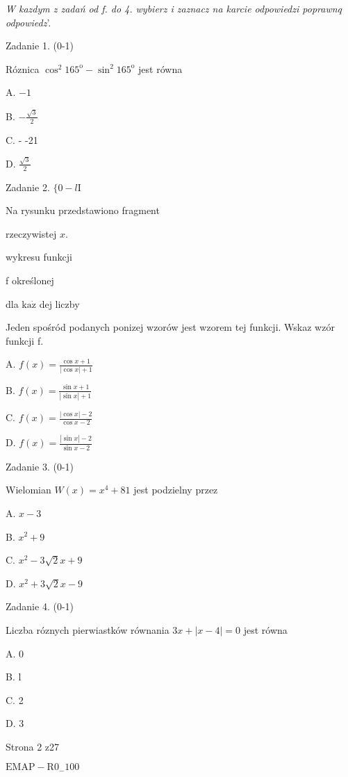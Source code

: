 \documentclass[a4paper,12pt]{article}
\begin{document}
{\it W kazdym z zadań od f. do 4. wybierz i zaznacz na karcie odpowiedzi poprawnq odpowiedz}'.

Zadanie 1. (0-1)

Róznica $\cos^{2}165^{\mathrm{o}}-\sin^{2}165^{\mathrm{o}}$ jest równa

A. $-1$

B. $-\displaystyle \frac{\sqrt{3}}{2}$

C. - -21

D. $\displaystyle \frac{\sqrt{3}}{2}$

Zadanie 2. $\{0-l\mathrm{I}$

Na rysunku przedstawiono fragment

rzeczywistej $x.$

wykresu funkcji

f określonej

dla $\mathrm{k}\mathrm{a}\dot{\mathrm{z}}$ dej liczby

Jeden spośród podanych ponizej wzorów jest wzorem tej funkcji. Wskaz wzór funkcji f.

A. $f(x)=\displaystyle \frac{\cos x+1}{|\cos x|+1}$

B. $f(x)=\displaystyle \frac{\sin x+1}{|\sin x|+1}$

C. $f(x)=\displaystyle \frac{|\cos x|-2}{\cos x-2}$

D. $f(x)=\displaystyle \frac{|\sin x|-2}{\sin x-2}$

Zadanie 3. (0-1)

Wielomian $W(x)=x^{4}+81$ jest podzielny przez

A. $x-3$

B. $x^{2}+9$

C. $x^{2}-3\sqrt{2}x+9$

D. $x^{2}+3\sqrt{2}x-9$

Zadanie 4. (0-1)

Liczba róznych pierwiastków równania $3x+|x-4|=0$ jest równa

A. 0

B. l

C. 2

D. 3

Strona 2 z27

$\mathrm{E}\mathrm{M}\mathrm{A}\mathrm{P}-\mathrm{R}0_{-}100$
\end{document}
